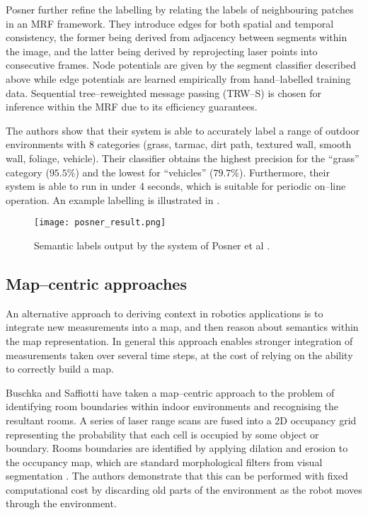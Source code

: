 Posner \etal further refine the labelling by relating the labels of
neighbouring patches in an MRF framework. They introduce edges for
both spatial and temporal consistency, the former being derived from
adjacency between segments within the image, and the latter being
derived by reprojecting laser points into consecutive frames. Node
potentials are given by the segment classifier described above
while edge potentials are learned empirically from hand--labelled
training data. Sequential tree--reweighted message passing (TRW--S) is
chosen for inference within the MRF due to its efficiency guarantees.

The authors show that their system is able to accurately label a range
of outdoor environments with 8 categories (grass, tarmac, dirt path,
textured wall, smooth wall, foliage, vehicle). Their classifier
obtains the highest precision for the ``grass'' category ($95.5\%$)
and the lowest for ``vehicles'' ($79.7\%$). Furthermore, their system
is able to run in under 4 seconds, which is suitable for periodic
on--line operation. An example labelling is illustrated in
.

\begin{figure}[tb]
\centering
\texttt{[image: posner\_result.png]}
\caption{Semantic labels output by the system of Posner et al
  \cite{Posner08}.}
\label{fig:posner-result}
\end{figure}

\subsection{Map--centric approaches}
An alternative approach to deriving context in robotics applications is
to integrate new measurements into a map, and then reason about
semantics within the map representation. In general this approach
enables stronger integration of measurements taken over several time
steps, at the cost of relying on the ability to correctly build a map.

Buschka and Saffiotti \cite{Buschka02} have taken a map--centric
approach to the problem of identifying room boundaries within indoor
environments and recognising the resultant rooms. A series of laser
range scans are fused into a 2D occupancy grid representing the
probability that each cell is occupied by some object or
boundary. Rooms boundaries are identified by applying dilation and
erosion to the occupancy map, which are standard morphological filters
from visual segmentation \cite{Forsyth02}. The
authors demonstrate that this can be performed with fixed
computational cost by discarding old parts of the environment as the
robot moves through the environment.

